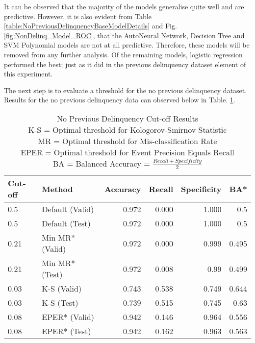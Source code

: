 It can be observed that the majority of the models generalise quite well and are predictive. However, it is also evident from Table \ref{table:NoPreviousDelinquencyBaseModelDetails} and Fig. \ref{fig:NonDelinq_Model_ROC}, that the AutoNeural Network, Decision Tree and SVM Polynomial models are not at all predictive. Therefore, these models will be removed from any further analysis. Of the remaining models, logistic regression performed the best; just as it did in the previous delinquency dataset element of this experiment. 

The next step is to evaluate a threshold for the no previous delinquency dataset. Results for the no previous delinquency data can observed below in Table. \ref{table:NoDelinquencyModelCutoff}.

\begin{table}[H]
	\centering
	\small
		\begin{tabular}{|l|l|r|r|r|r|}
			\hline
			\textbf{Cut-off} & \textbf{Method} & \textbf{Accuracy} & \textbf{Recall} & \textbf{Specificity}  & \textbf{BA*}  \\ \hline
			0.5             & Default (Valid)  & 0.972             & 0.000           & 1.000                  & 0.5     \\
			0.5             & Default (Test)   & 0.972             & 0.000           & 1.000                  & 0.5     \\ \hline
			
			0.21            & Min MR* (Valid)   & 0.972             & 0.000           & 0.999                    & 0.495   \\
			0.21            & Min MR* (Test)    & \cellcolor{yellow!25}0.972             & 0.008                         & \cellcolor{yellow!25}0.99  & 0.499     \\ \hline
			
			0.03            & K-S (Valid)      & 0.743             & 0.538           & 0.749                 & 0.644     \\
			0.03            & K-S (Test)       & 0.739             & \cellcolor{yellow!25}0.515                          & 0.745  & \cellcolor{yellow!25}0.63     \\ \hline
			
			0.08            & EPER* (Valid)     & 0.942             & 0.146           & 0.964                   & 0.556   \\
			0.08            & EPER* (Test)      & 0.942             & 0.162           & 0.963                 & 0.563     \\ \hline
		\end{tabular}
	\caption{No Previous Delinquency Cut-off Results
			\\ K-S = Optimal threshold for Kologorov-Smirnov Statistic
			\\ MR = Optimal threshold for Mis-classification Rate
			\\ EPER = Optimal threshold for Event Precision Equals Recall
			\\ BA = Balanced Accuracy = $\frac{Recall + Specificity }{2}$
			}
	\label{table:NoDelinquencyModelCutoff}
\end{table}

